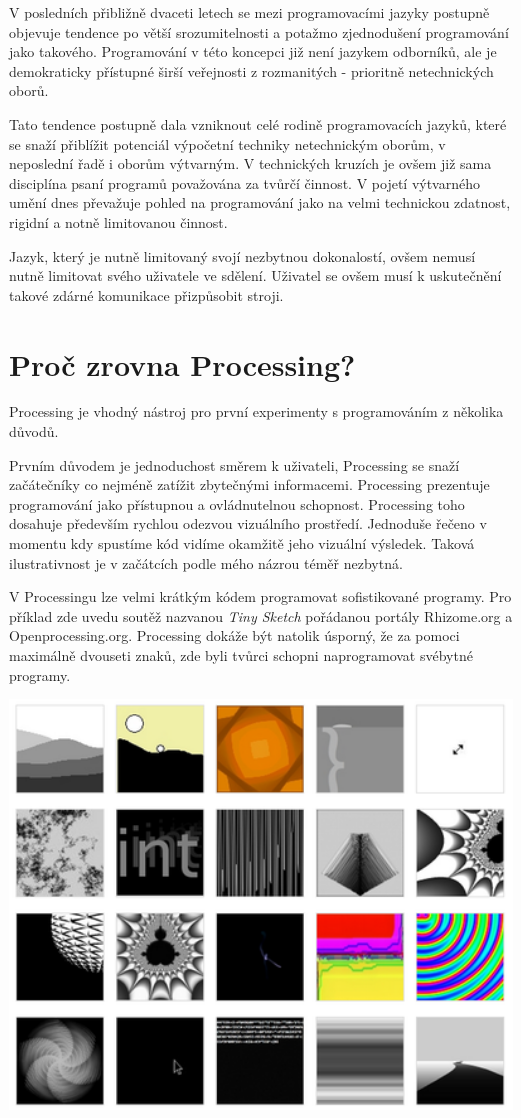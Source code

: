 \documentclass[10pt]{book}
\newcommand{\oddil}[1]{\section{#1}\index{#1}\label{#1}}
\begin{document}
V posledních přibližně dvaceti letech se mezi programovacími jazyky postupně objevuje tendence po větší srozumitelnosti a potažmo zjednodušení programování jako takového. Programování v této koncepci již není jazykem odborníků, ale je demokraticky přístupné širší veřejnosti z rozmanitých - prioritně netechnických oborů.

Tato tendence postupně dala vzniknout celé rodině programovacích jazyků, které se snaží přiblížit potenciál výpočetní techniky netechnickým oborům, v neposlední řadě i oborům výtvarným. V technických kruzích je ovšem již sama disciplína psaní programů považována za tvůrčí činnost. V pojetí výtvarného umění dnes převažuje pohled na programování jako na velmi technickou zdatnost, rigidní a notně limitovanou činnost.

Jazyk, který je nutně limitovaný svojí nezbytnou dokonalostí, ovšem nemusí nutně limitovat svého uživatele ve sdělení. Uživatel se ovšem musí  k uskutečnění takové zdárné komunikace přizpůsobit stroji.


\oddil{Proč zrovna Processing?}

Processing je vhodný nástroj pro první experimenty s programováním z několika důvodů.

Prvním důvodem je jednoduchost směrem k uživateli, Processing se snaží začátečníky co nejméně zatížit zbytečnými informacemi. Processing prezentuje programování jako přístupnou a ovládnutelnou schopnost. Processing toho dosahuje především rychlou odezvou vizuálního prostředí. Jednoduše řečeno v momentu kdy spustíme kód vidíme okamžitě jeho vizuální výsledek. Taková ilustrativnost je v začátcích podle mého názrou téměř nezbytná.

V Processingu lze velmi krátkým kódem programovat sofistikované programy. Pro příklad zde uvedu soutěž nazvanou {\em Tiny Sketch} pořádanou portály Rhizome.org a Openprocessing.org. Processing dokáže být natolik úsporný, že za pomoci maximálně dvouseti znaků, zde byli tvůrci schopni naprogramovat svébytné programy.


\begin{center}
\includegraphics[width = 1\textwidth]{imgs/tinysketch.png}
\end{center}
\end{document}
